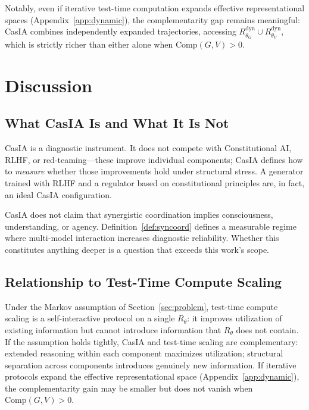 \documentclass[11pt,a4paper]{article}
\theoremstyle{definition}
\newcommand{\Rtheta}{R_\theta}
\newcommand{\thetaG}{\theta_G}
\newcommand{\thetaV}{\theta_V}
\begin{document}
Notably, even if iterative test-time computation expands effective representational spaces (Appendix~\ref{app:dynamic}), the complementarity gap remains meaningful: CasIA combines independently expanded trajectories, accessing $R_{\thetaG}^\text{dyn} \cup R_{\thetaV}^\text{dyn}$, which is strictly richer than either alone when $\mathrm{Comp}(G,V) > 0$.


\section{Discussion}
\label{sec:discussion}

\subsection{What CasIA Is and What It Is Not}

CasIA is a diagnostic instrument. It does not compete with Constitutional AI, RLHF, or red-teaming---these improve individual components; CasIA defines how to \emph{measure} whether those improvements hold under structural stress. A generator trained with RLHF and a regulator based on constitutional principles are, in fact, an ideal CasIA configuration.

CasIA does not claim that synergistic coordination implies consciousness, understanding, or agency. Definition~\ref{def:syncoord} defines a measurable regime where multi-model interaction increases diagnostic reliability. Whether this constitutes anything deeper is a question that exceeds this work's scope.

\subsection{Relationship to Test-Time Compute Scaling}

Under the Markov assumption of Section~\ref{sec:problem}, test-time compute scaling is a self-interactive protocol on a single $\Rtheta$: it improves utilization of existing information but cannot introduce information that $\Rtheta$ does not contain. If the assumption holds tightly, CasIA and test-time scaling are complementary: extended reasoning within each component maximizes utilization; structural separation across components introduces genuinely new information. If iterative protocols expand the effective representational space (Appendix~\ref{app:dynamic}), the complementarity gain may be smaller but does not vanish when $\mathrm{Comp}(G,V) > 0$.
\end{document}
